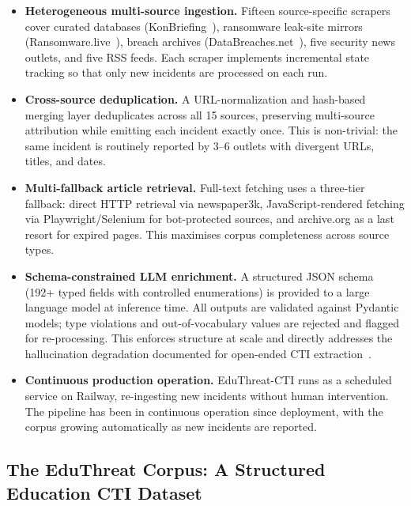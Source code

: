 \documentclass[sigconf,anonymous]{acmart}
\newcommand{\sys}{EduThreat-CTI\xspace}
\newcommand{\numsources}{15\xspace}
\begin{document}
\begin{itemize}[leftmargin=*,nosep]
  \item \textbf{Heterogeneous multi-source ingestion.} Fifteen source-specific scrapers cover curated databases (KonBriefing~\cite{konbriefing}), ransomware leak-site mirrors (Ransomware.live~\cite{ransomwarelive}), breach archives (DataBreaches.net~\cite{databreach2024}), five security news outlets, and five RSS feeds. Each scraper implements incremental state tracking so that only new incidents are processed on each run.

  \item \textbf{Cross-source deduplication.} A URL-normalization and hash-based merging layer deduplicates across all \numsources sources, preserving multi-source attribution while emitting each incident exactly once. This is non-trivial: the same incident is routinely reported by 3--6 outlets with divergent URLs, titles, and dates.

  \item \textbf{Multi-fallback article retrieval.} Full-text fetching uses a three-tier fallback: direct HTTP retrieval via newspaper3k, JavaScript-rendered fetching via Playwright/Selenium for bot-protected sources, and archive.org as a last resort for expired pages. This maximises corpus completeness across source types.

  \item \textbf{Schema-constrained LLM enrichment.} A structured JSON schema (192+ typed fields with controlled enumerations) is provided to a large language model at inference time. All outputs are validated against Pydantic models; type violations and out-of-vocabulary values are rejected and flagged for re-processing. This enforces structure at scale and directly addresses the hallucination degradation documented for open-ended CTI extraction~\cite{mezzi2025unreliable}.

  \item \textbf{Continuous production operation.} \sys runs as a scheduled service on Railway, re-ingesting new incidents without human intervention. The pipeline has been in continuous operation since deployment, with the corpus growing automatically as new incidents are reported.
\end{itemize}

\subsection{The EduThreat Corpus: A Structured Education CTI Dataset}\label{sec:contrib:dataset}
\end{document}
